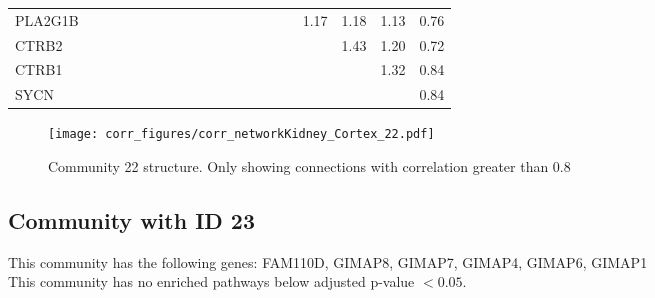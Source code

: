 \begin{longtable}{lrrrrrrrrrrrrrrrrrrr}
PLA2G1B  &              &              &              &              &             &             &             &            &            &            &            &             &             &                &               &        1.17 &        1.18 &       1.13 &        0.76 \\
CTRB2    &              &              &              &              &             &             &             &            &            &            &            &             &             &                &               &             &        1.43 &       1.20 &        0.72 \\
CTRB1    &              &              &              &              &             &             &             &            &            &            &            &             &             &                &               &             &             &       1.32 &        0.84 \\
SYCN     &              &              &              &              &             &             &             &            &            &            &            &             &             &                &               &             &             &            &        0.84 \\
\end{longtable}


\begin{figure}[h!]
\centering
\texttt{[image: corr\_figures/corr\_networkKidney\_Cortex\_22.pdf]}
\caption{Community 22 structure. Only showing connections with correlation greater than 0.8}
\end{figure}




\subsection*{Community with ID 23}
This community has the following genes: FAM110D, GIMAP8, GIMAP7, GIMAP4, GIMAP6, GIMAP1
\\
This community has no enriched pathways below adjusted p-value $< 0.05$.

